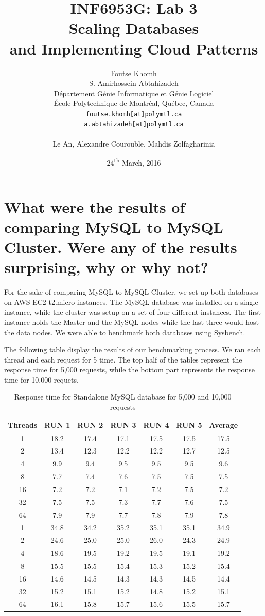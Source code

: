 \documentclass{article}
\title{INF6953G: Lab 3 \\Scaling Databases \\and Implementing Cloud Patterns}
\author{
    Foutse Khomh \\
    S. Amirhossein Abtahizadeh \\
    D\'{e}partement G\'{e}nie Informatique et G\'{e}nie Logiciel \\
    \'{E}cole Polytechnique de Montr\'{e}al, Qu\'{e}bec, Canada \\
    \texttt{foutse.khomh[at]polymtl.ca} \\
    \texttt{a.abtahizadeh[at]polymtl.ca}\\
    {} \\
    Le An, Alexandre Courouble, Mahdis Zolfagharinia
}
\date{24\textsuperscript{th} March, 2016}
\begin{document}
\maketitle



\section{What were the results of comparing MySQL to MySQL Cluster. Were any of the results surprising, why or why not?}\label{Q1}

For the sake of comparing MySQL to MySQL Cluster, we set up both databases on AWS EC2 t2.micro instances. The MySQL database was installed on a single instance, while the cluster was setup on a set of four different instances. The first instance holds the Master and the MySQL nodes while the last three would host the data nodes. We were able to benchmark both databases using Sysbench.




The following table display the results of our benchmarking process. We ran each thread and each request for 5 time. The top half of the tables represent the response time for 5,000 requests, while the bottom part represents the response time for 10,000 requets. 

\begin{table}[]
	\centering
	\caption{Response time for Standalone MySQL database for 5,000 and 10,000 requests}
	\label{my-label}
	\begin{tabular}{@{}ccccccc@{}}
		\toprule
		Threads & RUN 1   & RUN 2   & RUN 3   & RUN 4   & RUN 5   & Average      \\ \midrule\midrule
		1       & 18.2 & 17.4  & 17.1 & 17.5 & 17.5 & 17.5 \\
		2       & 13.4   & 12.3   & 12.2 & 12.2 & 12.7 & 12.5 \\
		4       & 9.9  & 9.4  & 9.5   & 9.5  & 9.5  & 9.6  \\
		8       & 7.7  & 7.4   & 7.6  & 7.5  & 7.5  & 7.5  \\
		16      & 7.2  & 7.2  & 7.1  & 7.2   & 7.5  & 7.2  \\
		32      & 7.5  & 7.5  & 7.3  & 7.7  & 7.6  & 7.5  \\
		64      & 7.9   & 7.9  & 7.7   & 7.8  & 7.9   & 7.8  \\\midrule
		1       & 34.8 & 34.2 & 35.2 & 35.1   & 35.1 & 34.9 \\
		2       & 24.6 & 25.0 & 25.0 & 26.0 & 24.3 & 24.9   \\
		4       & 18.6 & 19.5 & 19.2 & 19.5 & 19.1 & 19.2 \\
		8       & 15.5 & 15.5 & 15.4 & 15.3 & 15.2 & 15.4 \\
		16      & 14.6 & 14.5 & 14.3  & 14.3 & 14.5 & 14.4  \\
		32      & 15.2 & 15.1 & 15.2 & 14.8 & 15.2  & 15.1  \\
		64      & 16.1 & 15.8 & 15.7 & 15.6 & 15.5 & 15.7 \\ \bottomrule
	\end{tabular}
\end{table}
\end{document}

